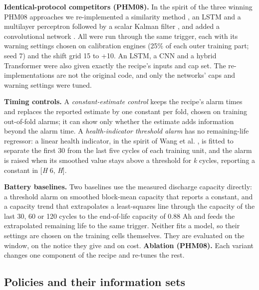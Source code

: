 \documentclass[a4paper,fleqn,doubleblind]{cas-dc}
\begin{document}
\textbf{Identical-protocol competitors (PHM08).} In the spirit of the three winning PHM08 approaches we re-implemented a similarity method \cite{wang2008}, an LSTM \cite{heimes2008,zheng2017} and a multilayer perceptron followed by a scalar Kalman filter \cite{peel2008}, and added a convolutional network \cite{li2018}. All were run through the same trigger, each with its warning settings chosen on calibration engines (25\% of each outer training part; seed 7) and the shift grid \textminus{}15 to +10. An LSTM, a CNN and a hybrid Transformer were also given exactly the recipe's inputs and cap set. The re-implementations are not the original code, and only the networks' caps and warning settings were tuned.

\textbf{Timing controls.} A \textit{constant-estimate control} keeps the recipe's alarm times and replaces the reported estimate by one constant per fold, chosen on training out-of-fold alarms; it can show only whether the estimate adds information beyond the alarm time. A \textit{health-indicator threshold alarm} has no remaining-life regressor: a linear health indicator, in the spirit of Wang et al. \cite{wang2008}, is fitted to separate the first 30 from the last five cycles of each training unit, and the alarm is raised when its smoothed value stays above a threshold for \textit{k} cycles, reporting a constant in [\textit{H} \textminus{} 6, \textit{H}].

\textbf{Battery baselines.} Two baselines use the measured discharge capacity directly: a threshold alarm on smoothed block-mean capacity that reports a constant, and a capacity trend that extrapolates a least-squares line through the capacity of the last 30, 60 or 120 cycles to the end-of-life capacity of 0.88 Ah and feeds the extrapolated remaining life to the same trigger. Neither fits a model, so their settings are chosen on the training cells themselves. They are evaluated on the window, on the notice they give and on cost. \textbf{Ablation (PHM08).} Each variant changes one component of the recipe and re-tunes the rest.

\subsection{Policies and their information sets}
\end{document}
